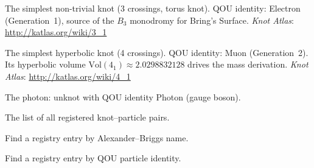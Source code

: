 \begin{definition}[Trefoil ($3_1$)]
  \label{def:trefoil}
  \leanok
  The simplest non-trivial knot (3 crossings, torus knot).
  QOU identity: Electron (Generation~1), source of the $B_3$ monodromy
  for Bring's Surface.
  \textit{Knot Atlas}: \url{http://katlas.org/wiki/3_1}
\end{definition}

\begin{definition}
  \label{def:figure-eight}
  \leanok
  The simplest hyperbolic knot (4 crossings).
  QOU identity: Muon (Generation~2).  Its hyperbolic volume
  $\mathrm{Vol}(4_1) \approx 2.0298832128$ drives the mass derivation.
  \textit{Knot Atlas}: \url{http://katlas.org/wiki/4_1}
\end{definition}

\begin{definition}
  \label{def:photon}
  \leanok
  The photon: unknot with QOU identity Photon (gauge boson).
\end{definition}

\begin{definition}
  \label{def:knot-registry}
  \leanok
  The list of all registered knot--particle pairs.
\end{definition}

\begin{definition}
  \label{def:registry-lookup}
  \leanok
  Find a registry entry by Alexander--Briggs name.
\end{definition}

\begin{definition}
  \label{def:registry-lookup-identity}
  \leanok
  Find a registry entry by QOU particle identity.
\end{definition}

